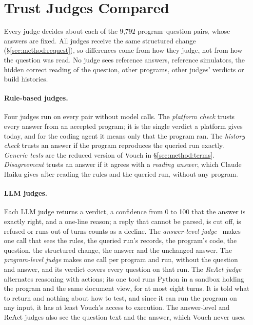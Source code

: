 \section{Trust Judges Compared}
\label{sec:judges}

Every judge decides about each of the 9{,}792 program--question pairs, whose answers are fixed. All judges receive the same structured change (\S\ref{sec:method:request}), so differences come from how they judge, not from how the question was read. No judge sees reference answers, reference simulators, the hidden correct reading of the question, other programs, other judges' verdicts or build histories.

\paragraph{Rule-based judges.} Four judges run on every pair without model calls. The \emph{platform check} trusts every answer from an accepted program; it is the single verdict a platform gives today, and for the coding agent it means only that the program ran. The \emph{history check} trusts an answer if the program reproduces the queried run exactly. \emph{Generic tests} are the reduced version of Vouch in \S\ref{sec:method:terms}. \emph{Disagreement} trusts an answer if it agrees with a \emph{reading answer}, which Claude Haiku gives after reading the rules and the queried run, without any program.

\paragraph{LLM judges.} Each LLM judge returns a verdict, a confidence from 0 to 100 that the answer is exactly right, and a one-line reason; a reply that cannot be parsed, is cut off, is refused or runs out of turns counts as a decline. The \emph{answer-level judge}~\cite{zheng2023judging} makes one call that sees the rules, the queried run's records, the program's code, the question, the structured change, the answer and the unchanged answer. The \emph{program-level judge} makes one call per program and run, without the question and answer, and its verdict covers every question on that run. The \emph{ReAct judge}~\cite{yao2023react} alternates reasoning with actions; its one tool runs Python in a sandbox holding the program and the same document view, for at most eight turns. It is told what to return and nothing about how to test, and since it can run the program on any input, it has at least Vouch's access to execution. The answer-level and ReAct judges also see the question text and the answer, which Vouch never uses.

